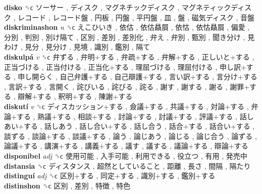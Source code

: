 \textbf{disko} ␝ϲ   ソーサー ,  ディスク ,  マグネチックディスク ,  マグネティックディスク ,  レコード ,  レコード盤 ,  円板 ,  円盤 ,  平円盤 ,  皿 ,  盤 ,  磁気ディスク ,  音盤   \\
\textbf{diskriminashon} \emph{n}  ␝ϲ   えこひいき ,  依估 ,  依估贔屓 ,  依怙 ,  依怙贔屓 ,  偏愛 ,  分別 ,  判別 ,  別け隔て ,  区別 ,  差別 ,  差別化 ,  弁え ,  弁別 ,  甄別 ,  聞き分け ,  見わけ ,  見分 ,  見分け ,  見境 ,  識別 ,  鑑別 ,  隔て   \\
\textbf{diskulpá} \emph{v}  ␝ϲ   弁ずる ,  弁明+する ,  弁疏+する ,  弁解+する ,  正しいと+する ,  正当づける ,  正当付ける ,  正当化+する ,  理屈づける ,  理屈付ける ,  申し訳+する ,  申し開らく ,  自己弁護+する ,  自己辯護+する ,  言い訳+する ,  言分け+する ,  言訳+する ,  言開く ,  詫びいる ,  詫びる ,  詫る ,  謝す ,  謝する ,  謝る ,  謝罪+する ,  辯解+する ,  釈明+する ,  陳謝+する   \\
\textbf{diskutí} \emph{v}  ␝ϲ   ディスカッション+する ,  僉議+する ,  共議+する ,  対論+する ,  弁論+する ,  熟議+する ,  相談+する ,  討論+する ,  討議+する ,  評議+する ,  話しあい+する ,  話しあう ,  話し合い+する ,  話し合う ,  話合+する ,  話合い+する ,  談ずる ,  談論+する ,  談議+する ,  論う ,  論じあう ,  論じる ,  論じ合う ,  論ずる ,  論議+する ,  講演+する ,  講義+する ,  議す ,  議する ,  議論+する ,  辯論+する   \\
\textbf{disponibel} \emph{adj}  ␝ϲ   使用可能 ,  入手可能 ,  利用できる ,  役立つ ,  有用 ,  発売中   \\
\textbf{distansia} ␝ϲ   ディスタンス ,  超然としていること ,  距離 ,  長さ ,  間隔 ,  隔たり   \\
\textbf{distinguí} \emph{adj}  ␝ϲ   区別+する ,  同定+する ,  識別+する ,  鑑別+する   \\
\textbf{distinshon} ␝ϲ   区別 ,  差別 ,  特徴 ,  特色   \\
